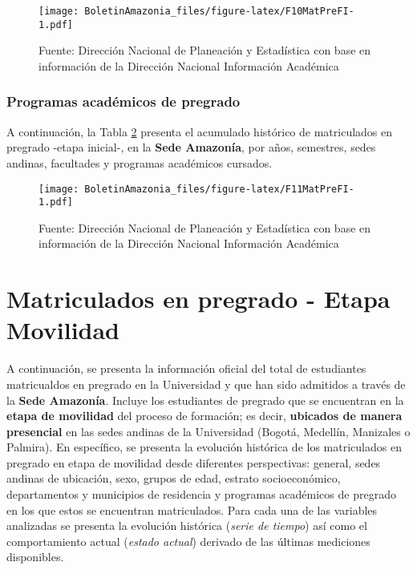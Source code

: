 \documentclass[
]{book}
\begin{document}
\begin{figure}
\centering
\texttt{[image: BoletinAmazonia\_files/figure-latex/F10MatPreFI-1.pdf]}
\caption{\label{fig:F10MatPreFI}Fuente: Dirección Nacional de Planeación y Estadística con base en información de la Dirección Nacional Información Académica}
\end{figure}

\hypertarget{programas-acaduxe9micos-de-pregrado-3}{%
\subsubsection{Programas académicos de pregrado}\label{programas-acaduxe9micos-de-pregrado-3}}

A continuación, la Tabla \ref{fig:F11MatPreFI} presenta el acumulado histórico de matriculados en pregrado -etapa inicial-, en la \textbf{Sede Amazonía}, por años, semestres, sedes andinas, facultades y programas académicos cursados.

\begin{figure}
\centering
\texttt{[image: BoletinAmazonia\_files/figure-latex/F11MatPreFI-1.pdf]}
\caption{\label{fig:F11MatPreFI}Fuente: Dirección Nacional de Planeación y Estadística con base en información de la Dirección Nacional Información Académica}
\end{figure}

\hypertarget{MatPreMov}{%
\section{Matriculados en pregrado - Etapa Movilidad}\label{MatPreMov}}

A continuación, se presenta la información oficial del total de estudiantes matricualdos en pregrado en la Universidad y que han sido admitidos a través de la \textbf{Sede Amazonía}. Incluye los estudiantes de pregrado que se encuentran en la \textbf{etapa de movilidad} del proceso de formación; es decir, \textbf{ubicados de manera presencial} en las sedes andinas de la Universidad (Bogotá, Medellín, Manizales o Palmira). En específico, se presenta la evolución histórica de los matriculados en pregrado en etapa de movilidad desde diferentes perspectivas: general, sedes andinas de ubicación, sexo, grupos de edad, estrato socioeconómico, departamentos y municipios de residencia y programas académicos de pregrado en los que estos se encuentran matriculados. Para cada una de las variables analizadas se presenta la evolución histórica (\emph{serie de tiempo}) así como el comportamiento actual (\emph{estado actual}) derivado de las últimas mediciones disponibles.
\end{document}
